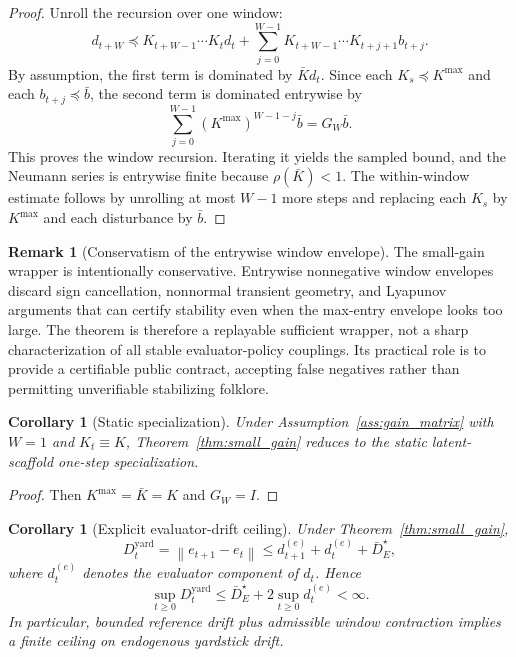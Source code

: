 \documentclass[11pt]{article}
\newtheorem{corollary}[theorem]{Corollary}
\theoremstyle{definition}
\newtheorem{remark}[theorem]{Remark}
\newcommand{\1}{\mathbf{1}}
\newcommand{\norm}[1]{\left\lVert #1 \right\rVert}
\begin{document}
\begin{proof}
Unroll the recursion over one window:
\[
d_{t+W}
\preceq
K_{t+W-1}\cdots K_t d_t
+
\sum_{j=0}^{W-1} K_{t+W-1}\cdots K_{t+j+1} b_{t+j}.
\]
By assumption, the first term is dominated by $\bar K d_t$. Since each $K_s\preceq K^{\max}$ and each $b_{t+j}\preceq \bar b$, the second term is dominated entrywise by
\[
\sum_{j=0}^{W-1} (K^{\max})^{W-1-j}\bar b = G_W\bar b.
\]
This proves the window recursion. Iterating it yields the sampled bound, and the Neumann series is entrywise finite because $\rho(\bar K)<1$. The within-window estimate follows by unrolling at most $W-1$ more steps and replacing each $K_s$ by $K^{\max}$ and each disturbance by $\bar b$.
\end{proof}

\begin{remark}[Conservatism of the entrywise window envelope]
The small-gain wrapper is intentionally conservative. Entrywise nonnegative window envelopes discard sign cancellation, nonnormal transient geometry, and Lyapunov arguments that can certify stability even when the max-entry envelope looks too large. The theorem is therefore a replayable sufficient wrapper, not a sharp characterization of all stable evaluator-policy couplings. Its practical role is to provide a certifiable public contract, accepting false negatives rather than permitting unverifiable stabilizing folklore.
\end{remark}

\begin{corollary}[Static specialization]\label{cor:static_small_gain}
Under Assumption~\ref{ass:gain_matrix} with $W=1$ and $K_t\equiv K$, Theorem~\ref{thm:small_gain} reduces to the static latent-scaffold one-step specialization.
\end{corollary}

\begin{proof}
Then $K^{\max}=\bar K=K$ and $G_W=I$.
\end{proof}

\begin{corollary}[Explicit evaluator-drift ceiling]\label{cor:yardstick_ceiling}
Under Theorem~\ref{thm:small_gain},
\[
D_t^{\mathrm{yard}}
=
\norm{e_{t+1}-e_t}
\le
 d_{t+1}^{(e)} + d_t^{(e)} + \bar D_E^\star,
\]
where $d_t^{(e)}$ denotes the evaluator component of $d_t$. Hence
\[
\sup_{t\ge 0} D_t^{\mathrm{yard}}
\le
\bar D_E^\star + 2\sup_{t\ge0}d_t^{(e)}<\infty.
\]
In particular, bounded reference drift plus admissible window contraction implies a finite ceiling on endogenous yardstick drift.
\end{corollary}
\end{document}
